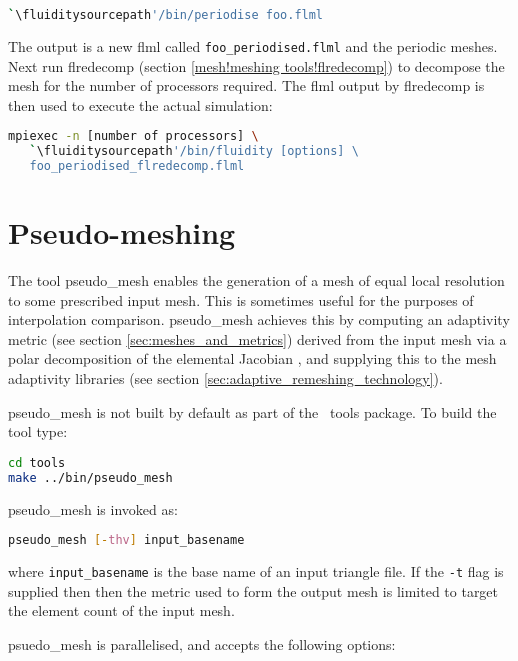 \begin{lstlisting}[language=bash]
`\fluiditysourcepath'/bin/periodise foo.flml
\end{lstlisting}

The output is a new flml called \lstinline+foo_periodised.flml+ and the
periodic meshes. Next run flredecomp (section \ref{mesh!meshing
  tools!flredecomp}) to decompose the mesh for the number of processors
required. The flml output by flredecomp is then used to execute the actual simulation:

\begin{lstlisting}[language=bash]
mpiexec -n [number of processors] \
   `\fluiditysourcepath'/bin/fluidity [options] \
   foo_periodised_flredecomp.flml
\end{lstlisting}

\section{Pseudo-meshing}

The tool pseudo\_mesh enables the generation of a mesh of equal local resolution
to some prescribed input mesh. This is sometimes useful for the purposes of
interpolation comparison. pseudo\_mesh achieves this by computing an adaptivity
metric (see section \ref{sec:meshes_and_metrics}) derived from the input mesh
via a polar decomposition of the
elemental Jacobian \citep{micheletti2006}, and supplying this to the mesh adaptivity libraries
(see section \ref{sec:adaptive_remeshing_technology}).

pseudo\_mesh is not built by default as part of the \fluidity\ tools package. To
build the tool type:

\begin{lstlisting}[language = Bash]
cd tools
make ../bin/pseudo_mesh
\end{lstlisting}

pseudo\_mesh is invoked as:

\begin{lstlisting}[language = Bash]
pseudo_mesh [-thv] input_basename
\end{lstlisting}

where \lstinline[language = Bash]*input_basename* is the base name of an input
triangle file. If the \lstinline[language = Bash]*-t* flag is supplied then
then the metric used to form the output mesh is limited to target the element
count of the input mesh.

psuedo\_mesh is parallelised, and accepts the following options:

